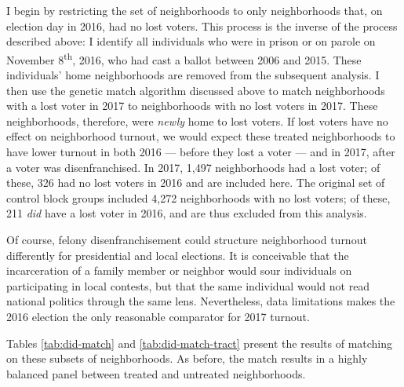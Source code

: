 \documentclass[12pt,]{article}
\begin{document}
I begin by restricting the set of neighborhoods to only neighborhoods that, on election day in 2016, had no lost voters. This process is the inverse of the process described above: I identify all individuals who were in prison or on parole on November 8\textsuperscript{th}, 2016, who had cast a ballot between 2006 and 2015. These individuals' home neighborhoods are removed from the subsequent analysis. I then use the genetic match algorithm discussed above to match neighborhoods with a lost voter in 2017 to neighborhoods with no lost voters in 2017. These neighborhoods, therefore, were \emph{newly} home to lost voters. If lost voters have no effect on neighborhood turnout, we would expect these treated neighborhoods to have lower turnout in both 2016 --- before they lost a voter --- and in 2017, after a voter was disenfranchised. In 2017, 1,497 neighborhoods had a lost voter; of these, 326 had no lost voters in 2016 and are included here. The original set of control block groups included 4,272 neighborhoods with no lost voters; of these, 211 \emph{did} have a lost voter in 2016, and are thus excluded from this analysis.

Of course, felony disenfranchisement could structure neighborhood turnout differently for presidential and local elections. It is conceivable that the incarceration of a family member or neighbor would sour individuals on participating in local contests, but that the same individual would not read national politics through the same lens. Nevertheless, data limitations makes the 2016 election the only reasonable comparator for 2017 turnout.

Tables \ref{tab:did-match} and \ref{tab:did-match-tract} present the results of matching on these subsets of neighborhoods. As before, the match results in a highly balanced panel between treated and untreated neighborhoods.
\end{document}
